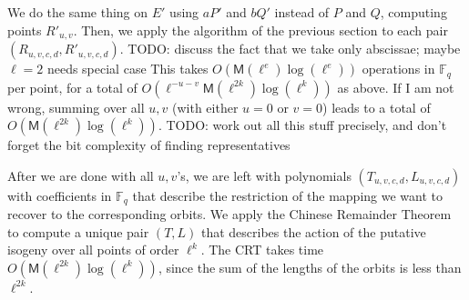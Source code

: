 \documentclass{lms}
\newcommand{\todo}[1]{{\color{red}TODO: #1}}
\newcommand{\M}{\mathsf{M}}
\newcommand{\F}{\mathbb{F}}
\begin{document}
We do the same thing on $E'$ using $aP'$ and $bQ'$ instead of $P$ and
$Q$, computing points $R'_{u,v}$. Then, we apply the algorithm of 
the previous section to each pair $(R_{u,v,c,d},R'_{u,v,c,d})$. \todo{discuss
the fact that we take only abscissae; maybe $\ell=2$ needs special case}
This takes $O(\M(\ell^e)\log(\ell^e))$ operations in $\F_q$ per point,
for a total of $O( \ell^{-u-v} \M(\ell^{2k})\log(\ell^k))$ as above.
If I am not wrong, summing over all $u,v$ 
(with either $u=0$ or $v=0$) leads to a total
of $O(\M(\ell^{2k})\log(\ell^k))$.
\todo{work out all this stuff precisely, and don't forget the bit complexity of 
finding representatives}

After we are done with all $u,v$'s, we are left with polynomials
$(T_{u,v,c,d},L_{u,v,c,d})$ with coefficients in $\F_q$ that describe
the restriction of the mapping we want to recover to the corresponding
orbits. We apply the Chinese Remainder Theorem to compute a unique
pair $(T,L)$ that describes the action of the putative isogeny over
all points of order $\ell^k$. The CRT takes time
$O(\M(\ell^{2k})\log(\ell^k))$, since the sum of the lengths of the
orbits is less than $\ell^{2k}$.

 

\end{document}
